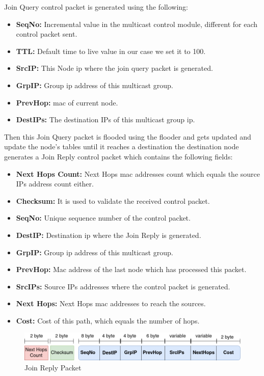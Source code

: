 Join Query control packet is generated using the following:
\begin{itemize}[itemsep=1pt, topsep=5pt]
    \item \textbf{SeqNo:} Incremental value in the multicast control module,
    different for each control packet sent.
    \item \textbf{TTL:} Default time to live value in our case we set it to 100.
    \item \textbf{SrcIP:} This Node \acrshort{ip} where the join query packet is generated.
    \item \textbf{GrpIP:} Group \acrshort{ip} address of this multicast group.
    \item \textbf{PrevHop:} \acrshort{mac} of current node.
    \item \textbf{DestIPs:} The destination IPs of this multicast group \acrshort{ip}.
\end{itemize}

Then this Join Query packet is flooded using the flooder and gets updated and update the node's tables until it reaches a destination the destination node generates a Join Reply control packet which contains the following fields:
\begin{itemize}[itemsep=1pt, topsep=5pt]
    \item \textbf{Next Hops Count:} Next Hops \acrshort{mac} addresses count which equals the source IPs address count either.
    \item \textbf{Checksum:} It is used to validate the received control packet.
    \item \textbf{SeqNo:} Unique sequence number of the control packet.
    \item \textbf{DestIP:} Destination \acrshort{ip} where the Join Reply is generated.
    \item \textbf{GrpIP:} Group \acrshort{ip} address of this multicast group.
    \item \textbf{PrevHop:} Mac address of the last node which has processed this packet.
    \item \textbf{SrcIPs:} Source IPs addresses where the control packet is generated.
    \item \textbf{Next Hops:} Next Hops \acrshort{mac} addresses to reach the sources.
    \item \textbf{Cost:} Cost of this path, which equals the number of hops.
\end{itemize}

\begin{figure}[!htbp]
    \centering
    \includegraphics[width=\linewidth]{images/join-reply.png}
    \caption{Join Reply Packet}
    \label{fig:join-reply}
\end{figure}

